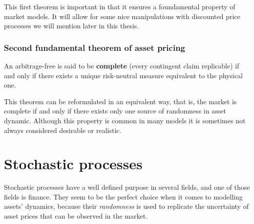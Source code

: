 \documentclass[times, utf8, diplomski]{fer}
\begin{document}
\hfill \break
This first theorem is important in that it ensures a foundamental property of market models. It will allow for some nice manipulations with discounted price processes we will mention later in this thesis.




\subsection{Second fundamental theorem of asset pricing}
\begin{theorem} \label{tm:ftap2}
	An arbitrage-free is said to be \textbf{complete} (every contingent claim replicable) if and only if there exists a unique risk-neutral measure equivalent to the physical one.
\end{theorem}

\hfill \break
This theorem can be reformulated in an equivalent way, that is, the market is complete if and only if there exists only one source of randomness in asset dynamic. Although this property is common in many models it is sometimes not always considered desirable or realistic. 
\chapter{Stochastic processes}
Stochastic processes have a well defined purpose in several fields, and one of those fields is finance. They seem to be the perfect choice when it comes to modelling assets' dynamics, because their \textit{randomness} is used to replicate the uncertainty of asset prices that can be observed in the market.\\
\end{document}
